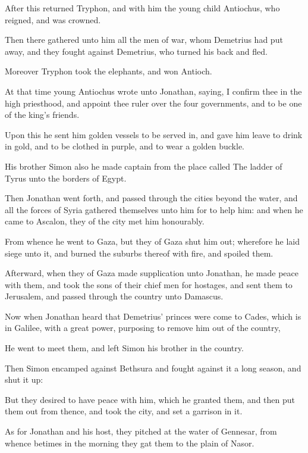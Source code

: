 {\par }{\PP {}After this returned Tryphon, and with him the young child Antiochus, who reigned, and was crowned.
\par }{\PP {}Then there gathered unto him all the men of war, whom Demetrius had put away, and they fought against Demetrius, who turned his back and fled.
\par }{\PP {}Moreover Tryphon took the elephants, and won Antioch.
\par }{\PP {}At that time young Antiochus wrote unto Jonathan, saying, I confirm thee in the high priesthood, and appoint thee ruler over the four governments, and to be one of the king’s friends.
\par }{\PP {}Upon this he sent him golden vessels to be served in, and gave him leave to drink in gold, and to be clothed in purple, and to wear a golden buckle.
\par }{\PP {}His brother Simon also he made captain from the place called The ladder of Tyrus unto the borders of Egypt.
\par }{\PP {}Then Jonathan went forth, and passed through the cities beyond the water, and all the forces of Syria gathered themselves unto him for to help him: and when he came to Ascalon, they of the city met him honourably.
\par }{\PP {}From whence he went to Gaza, but they of Gaza shut him out; wherefore he laid siege unto it, and burned the suburbs thereof with fire, and spoiled them.
\par }{\PP {}Afterward, when they of Gaza made supplication unto Jonathan, he made peace with them, and took the sons of their chief men for hostages, and sent them to Jerusalem, and passed through the country unto Damascus.
\par }{\PP {}Now when Jonathan heard that Demetrius’ princes were come to Cades, which is in Galilee, with a great power, purposing to remove him out of the country,
\par }{\PP {}He went to meet them, and left Simon his brother in the country.
\par }{\PP {}Then Simon encamped against Bethsura and fought against it a long season, and shut it up:
\par }{\PP {}But they desired to have peace with him, which he granted them, and then put them out from thence, and took the city, and set a garrison in it.
\par }{\PP {}As for Jonathan and his host, they pitched at the water of Gennesar, from whence betimes in the morning they gat them to the plain of Nasor.
}
